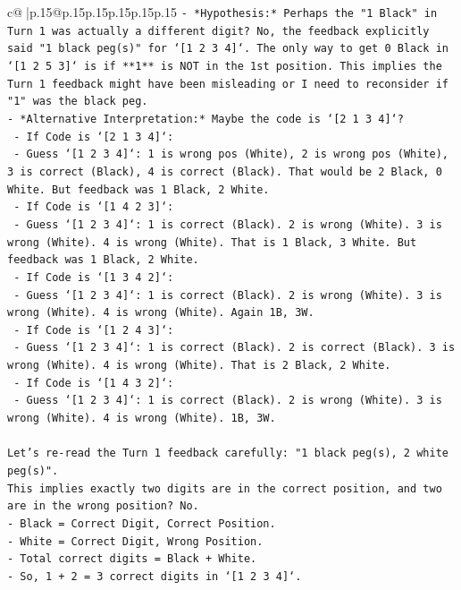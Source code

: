 \documentclass{article}
\begin{document}
{\begin{supertabular}{c@{$\;$}|p{.15\linewidth}@{}p{.15\linewidth}p{.15\linewidth}p{.15\linewidth}p{.15\linewidth}p{.15\linewidth}}
{{{\texttt{{-} *Hypothesis:* Perhaps the "1 Black" in Turn 1 was actually a different digit? No, the feedback explicitly said "1 black peg(s)" for `{[}1 2 3 4{]}`. The only way to get 0 Black in `{[}1 2 5 3{]}` is if **1** is NOT in the 1st position. This implies the Turn 1 feedback might have been misleading or I need to reconsider if "1" was the black peg.} \\
\texttt{{-} *Alternative Interpretation:* Maybe the code is `{[}2 1 3 4{]}`?} \\
\texttt{  {-} If Code is `{[}2 1 3 4{]}`:} \\
\texttt{    {-} Guess `{[}1 2 3 4{]}`: 1 is wrong pos (White), 2 is wrong pos (White), 3 is correct (Black), 4 is correct (Black). That would be 2 Black, 0 White. But feedback was 1 Black, 2 White.} \\
\texttt{  {-} If Code is `{[}1 4 2 3{]}`:} \\
\texttt{    {-} Guess `{[}1 2 3 4{]}`: 1 is correct (Black). 2 is wrong (White). 3 is wrong (White). 4 is wrong (White). That is 1 Black, 3 White. But feedback was 1 Black, 2 White.} \\
\texttt{  {-} If Code is `{[}1 3 4 2{]}`:} \\
\texttt{    {-} Guess `{[}1 2 3 4{]}`: 1 is correct (Black). 2 is wrong (White). 3 is wrong (White). 4 is wrong (White). Again 1B, 3W.} \\
\texttt{  {-} If Code is `{[}1 2 4 3{]}`:} \\
\texttt{    {-} Guess `{[}1 2 3 4{]}`: 1 is correct (Black). 2 is correct (Black). 3 is wrong (White). 4 is wrong (White). That is 2 Black, 2 White.} \\
\texttt{  {-} If Code is `{[}1 4 3 2{]}`:} \\
\texttt{    {-} Guess `{[}1 2 3 4{]}`: 1 is correct (Black). 2 is wrong (White). 3 is wrong (White). 4 is wrong (White). 1B, 3W.} \\
\\ 
\texttt{Let's re{-}read the Turn 1 feedback carefully: "1 black peg(s), 2 white peg(s)".} \\
\texttt{This implies exactly two digits are in the correct position, and two are in the wrong position? No.} \\
\texttt{{-} Black = Correct Digit, Correct Position.} \\
\texttt{{-} White = Correct Digit, Wrong Position.} \\
\texttt{{-} Total correct digits = Black + White.} \\
\texttt{{-} So, 1 + 2 = 3 correct digits in `{[}1 2 3 4{]}`.} \\
}}}
\end{supertabular}}
\end{document}
